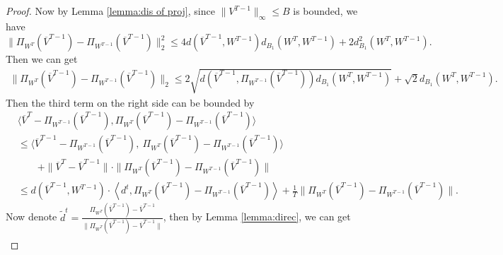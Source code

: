\begin{proof}
Now by Lemma \ref{lemma:dis of proj}, since $\|V^{T-1}\|_\infty\le B$ is bounded, we have 
$$\|\Pi_{W^T}(\overline{V}^{T-1}) - \Pi_{W^{T-1}}(\overline{V}^{T-1})\|_2^2 \le 4d(\overline{V}^{T-1}, W^{T-1})d_{B_1}(W^T, W^{T-1}) + 2d^2_{B_1}(W^T, W^{T-1}).$$
Then we can get 
\begin{align*}
    \|\Pi_{W^T}(\overline{V}^{T-1}) - \Pi_{W^{T-1}}(\overline{V}^{T-1})\|_2\le 2\sqrt{d(\overline{V}^{T-1}, \Pi_{W^{T-1}}(\overline{V}^{T-1}))d_{B_1}(W^T, W^{T-1})}+\sqrt{2}d_{B_1}(W^T, W^{T-1}).
\end{align*}
Then the third term on the right side can be bounded by 
\begin{align*}
    &\langle \overline{V}^T - \Pi_{W^{T-1}}(\overline{V}^{T-1}), \Pi_{W^T}(\overline{V}^{T-1}) - \Pi_{W^{T-1}}(\overline{V}^{T-1})\rangle\\&\le 
    \langle \overline{V}^{T-1} - \Pi_{W^{T-1}}(\overline{V}^{T-1}), \  \Pi_{W^T}(\overline{V}^{T-1}) - \Pi_{W^{T-1}}(\overline{V}^{T-1})\rangle\\
    &\qquad + \|\overline{V}^T - \overline{V}^{T-1}\|\cdot \| \Pi_{W^T}(\overline{V}^{T-1}) - \Pi_{W^{T-1}}(\overline{V}^{T-1})\|\\
    &\le d(\overline{V}^{T-1}, W^{T-1})\cdot \left\langle d^t,  \Pi_{W^T}(\overline{V}^{T-1}) - \Pi_{W^{T-1}}(\overline{V}^{T-1})\right\rangle + \frac{1}{T}\| \Pi_{W^T}(\overline{V}^{T-1}) - \Pi_{W^{T-1}}(\overline{V}^{T-1})\|.
\end{align*}
Now denote $\tilde{d}^t = \frac{\Pi_{W^T}(\overline{V}^{T-1})-\overline{V}^{T-1}}{\|\Pi_{W^T}(\overline{V}^{T-1})-\overline{V}^{T-1}\|}$, then by Lemma \ref{lemma:direc}, we can get 
\begin{align*}

\end{align*}
\end{proof}
